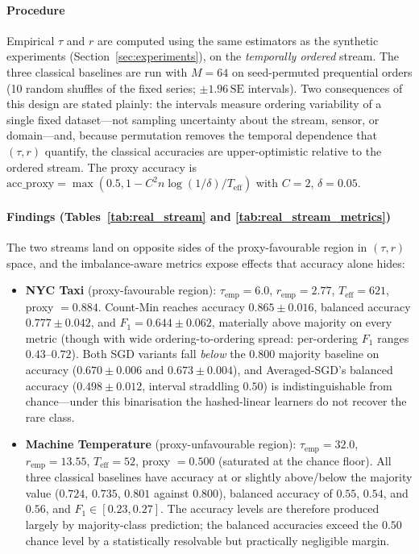 \documentclass[sensors,article,submit,pdftex,moreauthors]{Definitions/mdpi}
\newcommand{\Teff}{T_{\mathrm{eff}}}
\begin{document}
\paragraph{Procedure} Empirical $\tau$ and $r$ are computed using the same estimators as the synthetic experiments (Section~\ref{sec:experiments}), on the \emph{temporally ordered} stream. The three classical baselines are run with $M = 64$ on seed-permuted prequential orders (10 random shuffles of the fixed series; $\pm 1.96\,\mathrm{SE}$ intervals). Two consequences of this design are stated plainly: the intervals measure ordering variability of a single fixed dataset---not sampling uncertainty about the stream, sensor, or domain---and, because permutation removes the temporal dependence that $(\tau, r)$ quantify, the classical accuracies are upper-optimistic relative to the ordered stream. The proxy accuracy is $\mathrm{acc\_proxy} = \max(0.5, 1 - C^2 n \log(1/\delta) / \Teff)$ with $C = 2$, $\delta = 0.05$.

\paragraph{Findings (Tables~\ref{tab:real_stream} and \ref{tab:real_stream_metrics})} The two streams land on opposite sides of the proxy-favourable region in $(\tau, r)$ space, and the imbalance-aware metrics expose effects that accuracy alone hides:
\begin{itemize}
    \item \textbf{NYC Taxi} (proxy-favourable region): $\tau_{\text{emp}} = 6.0$, $r_{\text{emp}} = 2.77$, $\Teff = 621$, proxy $= 0.884$. Count-Min reaches accuracy $0.865 \pm 0.016$, balanced accuracy $0.777 \pm 0.042$, and $F_1 = 0.644 \pm 0.062$, materially above majority on every metric (though with wide ordering-to-ordering spread: per-ordering $F_1$ ranges $0.43$--$0.72$). Both SGD variants fall \emph{below} the $0.800$ majority baseline on accuracy ($0.670 \pm 0.006$ and $0.673 \pm 0.004$), and Averaged-SGD's balanced accuracy ($0.498 \pm 0.012$, interval straddling $0.50$) is indistinguishable from chance---under this binarisation the hashed-linear learners do not recover the rare class.
    \item \textbf{Machine Temperature} (proxy-unfavourable region): $\tau_{\text{emp}} = 32.0$, $r_{\text{emp}} = 13.55$, $\Teff = 52$, proxy $= 0.500$ (saturated at the chance floor). All three classical baselines have accuracy at or slightly above/below the majority value ($0.724$, $0.735$, $0.801$ against $0.800$), balanced accuracy of $0.55$, $0.54$, and $0.56$, and $F_1 \in [0.23, 0.27]$. The accuracy levels are therefore produced largely by majority-class prediction; the balanced accuracies exceed the $0.50$ chance level by a statistically resolvable but practically negligible margin.
\end{itemize}
\end{document}
